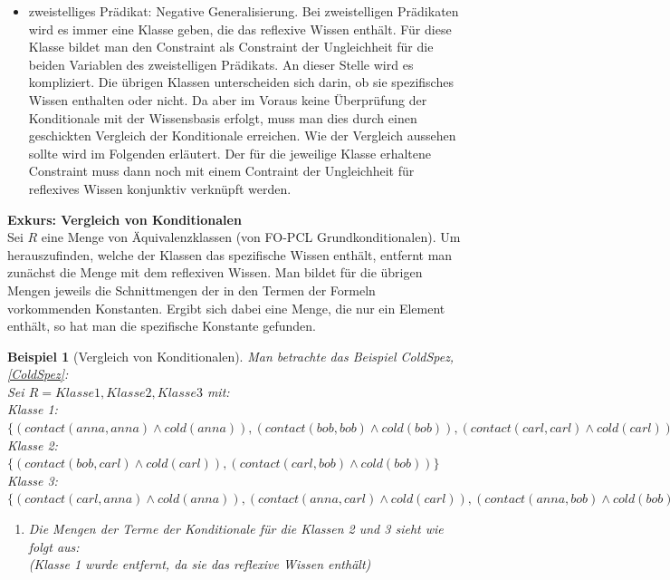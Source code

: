 \documentclass[a4paper, 11pt]{book}
\newtheorem{Bsp}{Beispiel}[section]
\begin{document}
{\begin{itemize}
\begin{itemize}
		\item zweistelliges Prädikat: Negative Generalisierung. Bei zweistelligen Prädikaten wird es immer eine Klasse geben, die das reflexive Wissen enthält. Für diese Klasse bildet man den Constraint als Constraint der Ungleichheit für die beiden Variablen des zweistelligen Prädikats. An dieser Stelle wird es kompliziert. Die übrigen Klassen unterscheiden sich darin, ob sie spezifisches Wissen enthalten oder nicht. Da aber im Voraus keine Überprüfung der Konditionale mit der Wissensbasis erfolgt, muss man dies durch einen geschickten Vergleich der Konditionale erreichen. Wie der Vergleich aussehen sollte wird im Folgenden erläutert. Der für die jeweilige Klasse erhaltene Constraint muss dann noch mit einem Contraint der Ungleichheit für reflexives Wissen konjunktiv verknüpft werden. 
		\end{itemize}
	\textbf{Exkurs: Vergleich von Konditionalen} \label{Vergleich von Konditionalen}  \\
	Sei $ R $ eine Menge von Äquivalenzklassen (von FO-PCL Grundkonditionalen). Um herauszufinden, welche der Klassen das  spezifische Wissen enthält, entfernt man zunächst die Menge mit dem reflexiven Wissen. Man bildet für die übrigen Mengen jeweils die Schnittmengen der in den Termen der Formeln vorkommenden Konstanten. Ergibt sich dabei eine Menge, die nur ein Element enthält, so hat man die spezifische Konstante gefunden. 
	\begin{Bsp}[Vergleich von Konditionalen]
		Man betrachte das Beispiel ColdSpez, \ref{ColdSpez}:\\
		Sei $ R = {Klasse 1, Klasse 2, Klasse 3} $ mit:\\
		Klasse 1: $ \{(contact(anna,anna) \land cold(anna)), (contact(bob,bob) \land cold(bob)), (contact(carl,carl) \land cold(carl)) \} $\\
		Klasse 2: $ \{(contact(bob,carl) \land cold(carl)), (contact(carl,bob) \land cold(bob)) \} $\\
		Klasse 3: $ \{(contact(carl,anna) \land cold(anna)), (contact(anna, carl) \land cold(carl)), (contact(anna,bob) \land cold(bob)), (contact(bob, anna) \land cold(anna)) \} $\\
 		\begin{enumerate}
 			\item Die Mengen der Terme der Konditionale für die Klassen 2 und 3 sieht wie folgt aus:\\
 			(Klasse 1 wurde entfernt, da sie das reflexive Wissen enthält)\\

\end{enumerate}
\end{Bsp}
\end{itemize}}
\end{document}
